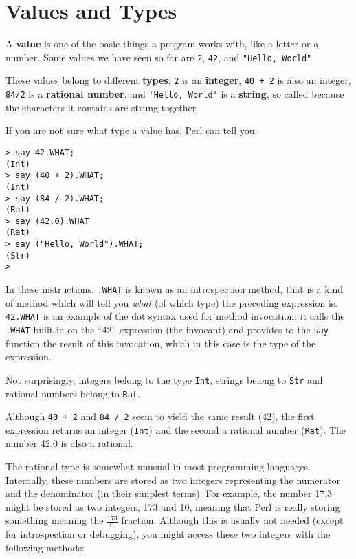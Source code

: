 \section{Values and Types}

A {\bf value} is one of the basic things a program works with, like a
letter or a number.  Some values we have seen so far are {\tt 2},
{\tt 42}, and \verb'"Hello, World"'.

These values belong to different {\bf types}:
{\tt 2} is an {\bf integer}, {\tt 40 + 2} is also an integer, 
{\tt 84/2} is a {\bf rational number},
and \verb"'Hello, World'" is a {\bf string}, so called 
because the characters it contains are strung together.

If you are not sure what type a value has, Perl can
tell you:

\begin{verbatim}
> say 42.WHAT;
(Int)
> say (40 + 2).WHAT;
(Int)
> say (84 / 2).WHAT;
(Rat)
> say (42.0).WHAT
(Rat)
> say ("Hello, World").WHAT;
(Str)
>
\end{verbatim}
%
In these instructions, {\tt .WHAT} is known as an 
introspection method, that is a kind of method which 
will tell you \emph{what} (of  which type) the preceding 
expression is. {\tt 42.WHAT} is an example of the dot 
syntax used for method invocation: it calls the {\tt .WHAT} 
built-in on the ``42'' expression (the invocant) and provides 
to the {\tt say} function the result of this invocation, 
which in this case is the type of the expression.

Not surprisingly, integers belong to the type {\tt Int},
strings belong to {\tt Str} and rational 
numbers belong to {\tt Rat}.  

Although {\tt 40 + 2} and {\tt 84 / 2} seem to yield the 
same result (42), the first expression returns an integer 
({\tt Int}) and the second a rational number ({\tt Rat}). 
The number 42.0 is also a rational.

The rational type is somewhat unusual in most programming 
languages. Internally, these numbers are stored as two 
integers representing the numerator and the denominator 
(in their simplest terms). For example, the number 17.3 
might be stored as two integers, 173 and 10, meaning that 
Perl is really storing something meaning the $\frac{173}{10}$ 
fraction. Although this is usually not needed (except 
for introspection or debugging), you might access these 
two integers with the following methods:

